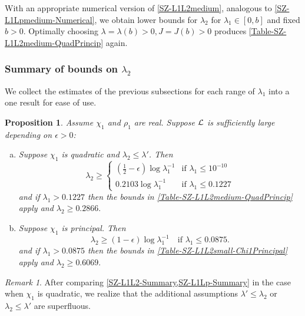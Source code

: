 \documentclass[12pt,psamsfonts]{amsart}
\newtheorem{prop}[thm]{Proposition}
\theoremstyle{definition}
\theoremstyle{remark}
\newtheorem*{rem*}{Remark}
\numberwithin{equation}{section}
\begin{document}
With an appropriate numerical version of \cref{SZ-L1L2medium}, analogous to \cref{SZ-L1Lpmedium-Numerical}, we obtain lower bounds for $\lambda_2$ for $\lambda_1 \in [0,b]$ and fixed $b > 0$. Optimally choosing $\lambda = \lambda(b) > 0, J = J(b) > 0$  produces \cref{Table-SZ-L1L2medium-QuadPrincip} again. %

\subsubsection{Summary of bounds on $\lambda_2$}
We collect the estimates of the previous subsections for each range of $\lambda_1$ into a  one result for ease of use. 

\begin{prop} \label{SZ-L1L2-Summary} Assume $\chi_1$ and $\rho_1$ are real. Suppose $\mathcal{L}$ is sufficiently large depending on $\epsilon > 0$:
\begin{enumerate}[(a)]
	\item Suppose $\chi_1$ is quadratic and $\lambda_2 \leq \lambda'$. Then
	\[
	\lambda_2 \geq 
	\begin{cases}
	(\tfrac{1}{2}-\epsilon) \log \lambda_1^{-1} & \text{if $\lambda_1 \leq 10^{-10}$}  \\
	0.2103 \log \lambda_1^{-1} & \text{if $\lambda_1 \leq 0.1227$}
	\end{cases}
	\]
	and if $\lambda_1 > 0.1227$ then the bounds in \cref{Table-SZ-L1L2medium-QuadPrincip} apply and $\lambda_2 \geq 0.2866.$
	\item Suppose $\chi_1$ is principal. Then 
	\[
	\lambda_2 \geq (1-\epsilon) \log \lambda_1^{-1} \quad \text{if $\lambda_1 \leq 0.0875$}.
	\]
	and if $\lambda_1 > 0.0875$ then the bounds in \cref{Table-SZ-L1L2small-Chi1Principal} apply and $\lambda_2 \geq 0.6069.$
\end{enumerate}
\end{prop}
\begin{rem*} After comparing \cref{SZ-L1L2-Summary,SZ-L1Lp-Summary} in the case when $\chi_1$ is quadratic, we realize that the additional assumptions $\lambda'\leq \lambda_2$ or $\lambda_2 \leq \lambda'$ are superfluous. 
\end{rem*}
\end{document}
